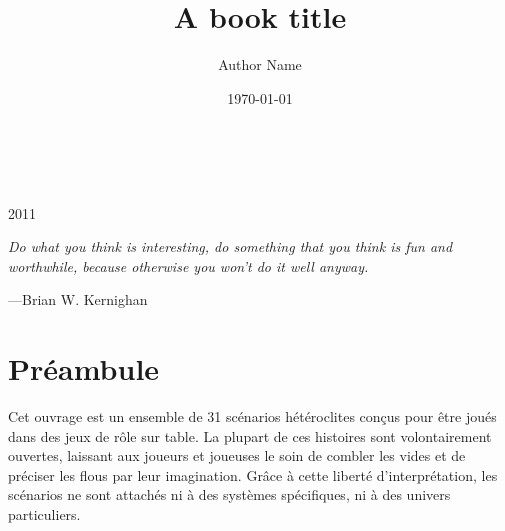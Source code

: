 \documentclass[a5paper,pagesize,10pt,bibtotoc,pointlessnumbers,
normalheadings,DIV=9,twoside=false]{scrbook}
\title{A book title}
\author{Author Name}
\date{\today}
\begin{document}
\begin{titlepage}
		\\
			
		\vspace{10mm}
		\\
		\vspace{\fill}
		\centering \large{2011}
\end{titlepage}


\newpage{}
\thispagestyle {empty}

\vspace*{2cm}

\begin{center}
	\Large{\parbox{10cm}{
		\begin{raggedright}
		{\Large 
			\textit{Do what you think is interesting, 
			do something that you think is fun and worthwhile, 
			because otherwise you won’t do it well anyway.}
		}
	
		\vspace{.5cm}\hfill{---Brian W. Kernighan}
		\end{raggedright}
	}
}
\end{center}

\newcommand\keywords[3]{%
	\section*{Mots-clés :}

	\textbf{Cadre} : #1

	\textbf{Genre} : #2

	\textbf{Thème} : #3
}%

\newcommand\medfan[1]{%
	\emph{medfan}
}%

\newpage


\chapter*{Préambule}

Cet ouvrage est un ensemble de 31 scénarios hétéroclites conçus pour être joués dans des jeux de rôle sur table.
La plupart de ces histoires sont volontairement ouvertes, laissant aux joueurs et joueuses le soin de combler les vides et de préciser les flous par leur imagination.
Grâce à cette liberté d'interprétation, les scénarios ne sont attachés ni à des systèmes spécifiques, ni à des univers particuliers.
\end{document}
